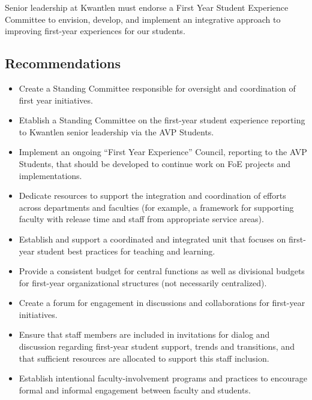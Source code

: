 \documentclass[10pt, letterpaper]{article}
\begin{document}
Senior leadership at Kwantlen must endorse a First Year Student
Experience Committee to envision, develop, and implement an integrative
approach to improving first-year experiences for our students.

\subsection{Recommendations}

\begin{itemize}
\item
  Create a Standing Committee responsible for oversight and coordination
  of first year initiatives.
\item
  Etablish a Standing Committee on the first-year student experience
  reporting to Kwantlen senior leadership via the AVP Students.
\item
  Implement an ongoing ``First Year Experience'' Council, reporting to
  the AVP Students, that should be developed to continue work on FoE
  projects and implementations.
\end{itemize}

\begin{itemize}
\item
  Dedicate resources to support the integration and coordination of
  efforts across departments and faculties (for example, a framework for
  supporting faculty with release time and staff from appropriate
  service areas).
\item
  Establish and support a coordinated and integrated unit that focuses
  on first-year student best practices for teaching and learning.
\item
  Provide a consistent budget for central functions as well as
  divisional budgets for first-year organizational structures (not
  necessarily centralized).
\end{itemize}

\begin{itemize}
\item
  Create a forum for engagement in discussions and collaborations for
  first-year initiatives.
\item
  Ensure that staff members are included in invitations for dialog and
  discussion regarding first-year student support, trends and
  transitions, and that sufficient resources are allocated to support
  this staff inclusion.
\item
  Establish intentional faculty-involvement programs and practices to
  encourage formal and informal engagement between faculty and students.
\end{itemize}
\end{document}
